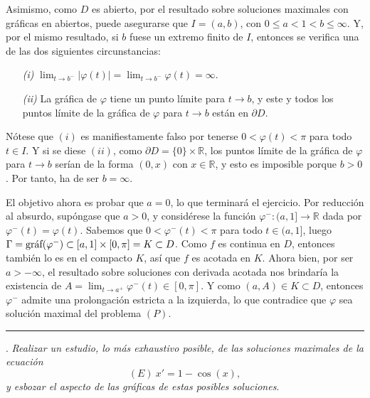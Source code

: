 \documentclass[11pt]{report}
\newcommand{\R}{\mathbb R}
\begin{document}
Asimismo, como $D$ es abierto, por el resultado sobre soluciones maximales con gráficas en abiertos, puede asegurarse que $I=(a,b)$, con $0\leq a<1<b \leq \infty$. Y, por el mismo resultado, si $b$ fuese un extremo finito de $I$, entonces se verifica una de las dos siguientes circunstancias:
\begin{itemize}
    \item[\textit{(i)}] $\displaystyle \lim_{t \to b^-} |\varphi(t)| = \lim_{t \to b^-} \varphi(t)=\infty$.
    \item[\textit{(ii)}] La gráfica de $\varphi$ tiene un punto límite para $t \to b$, y este y todos los puntos límite de la gráfica de $\varphi$ para $t \to b$ están en $\partial D$.
\end{itemize}

Nótese que $(i)$ es manifiestamente falso por tenerse $0<\varphi(t)<\pi$ para todo $t \in I$. Y si se diese $(ii)$, como $\partial D = \{0\} \times \R$, los puntos límite de la gráfica de $\varphi$ para $t \to b$ serían de la forma $(0,x)$ con $ x \in \R$, y esto es imposible porque $b > 0$. Por tanto, ha de ser $b = \infty$.

\vspace{2mm}

El objetivo ahora es probar que $a=0$, lo que terminará el ejercicio. Por reducción al absurdo, supóngase que $a>0$, y considérese la función $\varphi^- \colon (a,1] \to \R$ dada por $\varphi^-(t)=\varphi(t)$. Sabemos que $0<\varphi^-(t)<\pi$ para todo $t \in (a,1]$, luego $\Gamma = \textup{gráf}(\varphi^-) \subset [a,1] \times [0,\pi] =K \subset D$. Como $f$ es continua en $D$, entonces también lo es en el compacto $K$, así que $f$ es acotada en $K$. Ahora bien, por ser $a>-\infty$, el resultado sobre soluciones con derivada acotada nos brindaría la existencia de $A=\lim_{t \to a^+} \varphi^-(t) \in [0,\pi]$. Y como $(a,A) \in K \subset D$, entonces $\varphi^-$ admite una prolongación estricta a la izquierda, lo que contradice que $\varphi$ sea solución maximal del problema $(P)$.

\vspace{4mm}

\hrule

\vspace{4mm}

. \textit{Realizar un estudio, lo más exhaustivo posible, de las soluciones maximales de la ecuación}
\[(E) \ x'=1-\cos(x),\]
\textit{y esbozar el aspecto de las gráficas de estas posibles soluciones}.
\end{document}
